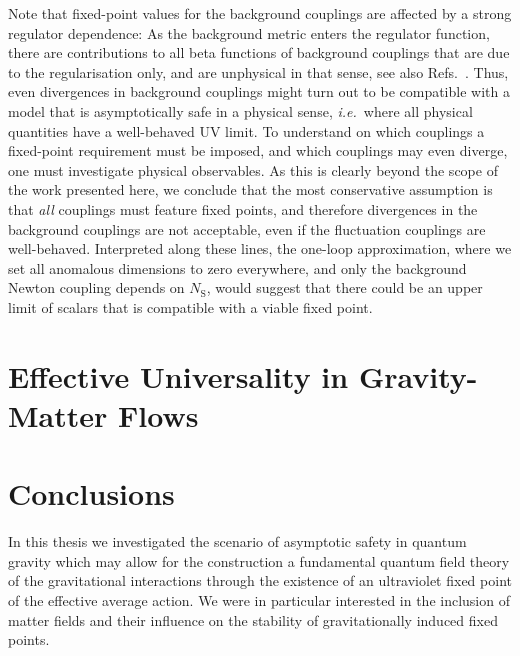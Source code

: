 \documentclass[11pt]{book}
\newcommand\NS{ N_{\scriptscriptstyle{\mathrm{S}}} }
\newcommand\ie{\textit{i.e.}\ }
\numberwithin{equation}{chapter}
\begin{document}
Note that fixed-point values for the background couplings are affected by a strong regulator dependence:
As the background metric enters the regulator function,
there are contributions to all beta functions of background couplings that are due to the regularisation only,
and are unphysical in that sense, see also
Refs.~\cite{Folkerts:2011jz, Litim:2002ce, Litim:2002hj, Bridle:2013sra}.
Thus, even divergences in background couplings might turn out to be compatible with a model that
is asymptotically safe in a physical sense, \ie where all physical quantities have a well-behaved UV limit.
To understand on which couplings a fixed-point requirement must be imposed,
and which couplings may even diverge, one must investigate physical observables.
As this is clearly beyond the scope of the work presented here, we conclude that the most conservative
assumption is that \emph{all} couplings must feature fixed points,
and therefore divergences in the background couplings are not acceptable,
even if the fluctuation couplings are well-behaved. Interpreted along these lines,
the one-loop approximation, where we set all anomalous dimensions to zero everywhere,
and only the background Newton coupling depends on $\NS$,
would suggest that there could be an upper limit of scalars that is compatible with a viable fixed point.




\chapter{Effective Universality in Gravity-Matter Flows}
\label{ch:jan}




\chapter*{Conclusions}

In this thesis we investigated the scenario of asymptotic safety in quantum gravity
which may allow for the construction a fundamental quantum field theory of the
gravitational interactions through the existence of an ultraviolet fixed point
of the effective average action. We were in particular interested in the inclusion
of matter fields and their influence on the stability of gravitationally induced
fixed points.
\end{document}
